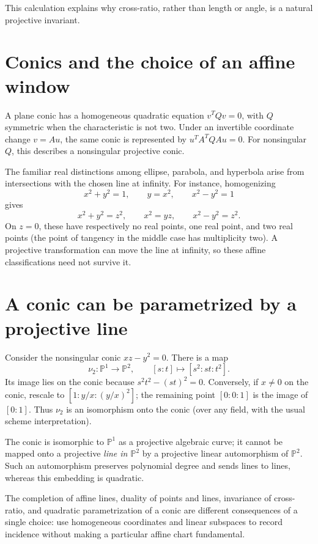 This calculation explains why cross-ratio, rather than length or angle, is a natural projective invariant.

\section{Conics and the choice of an affine window}

A plane conic has a homogeneous quadratic equation \(v^TQv=0\), with \(Q\) symmetric when the characteristic is not two. Under an invertible coordinate change \(v=Au\), the same conic is represented by \(u^TA^TQAu=0\). For nonsingular \(Q\), this describes a nonsingular projective conic.

The familiar real distinctions among ellipse, parabola, and hyperbola arise from intersections with the chosen line at infinity. For instance, homogenizing
\[
 x^2+y^2=1,\qquad y=x^2,\qquad x^2-y^2=1
\]
gives
\[
 x^2+y^2=z^2,\qquad x^2=yz,\qquad x^2-y^2=z^2.
\]
On \(z=0\), these have respectively no real points, one real point, and two real points (the point of tangency in the middle case has multiplicity two). A projective transformation can move the line at infinity, so these affine classifications need not survive it.

\section{A conic can be parametrized by a projective line}

Consider the nonsingular conic \(xz-y^2=0\). There is a map
\[
 \nu_2:\mathbb P^1\longrightarrow \mathbb P^2,\qquad
 [s:t]\longmapsto[s^2:st:t^2].
\]
Its image lies on the conic because \(s^2t^2-(st)^2=0\). Conversely, if \(x\ne0\) on the conic, rescale to \([1:y/x:(y/x)^2]\); the remaining point \([0:0:1]\) is the image of \([0:1]\). Thus \(\nu_2\) is an isomorphism onto the conic (over any field, with the usual scheme interpretation).

\begin{caution}
The conic is isomorphic to \(\mathbb P^1\) as a projective algebraic curve; it cannot be mapped onto a projective \emph{line in \(\mathbb P^2\)} by a projective linear automorphism of \(\mathbb P^2\). Such an automorphism preserves polynomial degree and sends lines to lines, whereas this embedding is quadratic.
\end{caution}

The completion of affine lines, duality of points and lines, invariance of cross-ratio, and quadratic parametrization of a conic are different consequences of a single choice: use homogeneous coordinates and linear subspaces to record incidence without making a particular affine chart fundamental.
